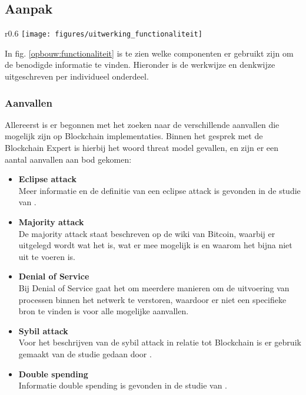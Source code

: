 \newpage
\subsection{Aanpak}

\begin{wrapfigure}[14]{r}{0.6\textwidth}
  \texttt{[image: figures/uitwerking\_functionaliteit]}
  \caption[Opbouw beantwoording ``Functionaliteit en gevaren'']{Componenten en termen die als leidraad gebruikt zijn om het resultaat te beschrijven.}
  \label{opbouw:functionaliteit}
\end{wrapfigure}

In fig. \ref{opbouw:functionaliteit} is te zien welke componenten er gebruikt zijn om de benodigde informatie te vinden. Hieronder is de werkwijze en denkwijze uitgeschreven per individueel onderdeel.

\subsubsection{Aanvallen}

Allereerst is er begonnen met het zoeken naar de verschillende aanvallen die mogelijk zijn op Blockchain implementaties. Binnen het gesprek met de Blockchain Expert is hierbij het woord threat model gevallen, en zijn er een aantal aanvallen aan bod gekomen:

\begin{itemize}
  \item \textbf{Eclipse attack}
  \\ Meer informatie en de definitie van een eclipse attack is gevonden in de studie van \cite{heilman2015eclipse}.

  \item \textbf{Majority attack}
  \\ De majority attack staat beschreven op de wiki van Bitcoin, waarbij er uitgelegd wordt wat het is, wat er mee mogelijk is en waarom het bijna niet uit te voeren is.

  \item \textbf{Denial of Service}
  \\ Bij Denial of Service gaat het om meerdere manieren om de uitvoering van processen binnen het netwerk te verstoren, waardoor er niet een specifieke bron te vinden is voor alle mogelijke aanvallen.

  \item \textbf{Sybil attack}
  \\ Voor het beschrijven van de sybil attack in relatie tot Blockchain is er gebruik gemaakt van de studie gedaan door \cite{conti2017survey}.

  \item \textbf{Double spending}
  \\ Informatie double spending is gevonden in de studie van \cite{karame2012double}.
\end{itemize}

